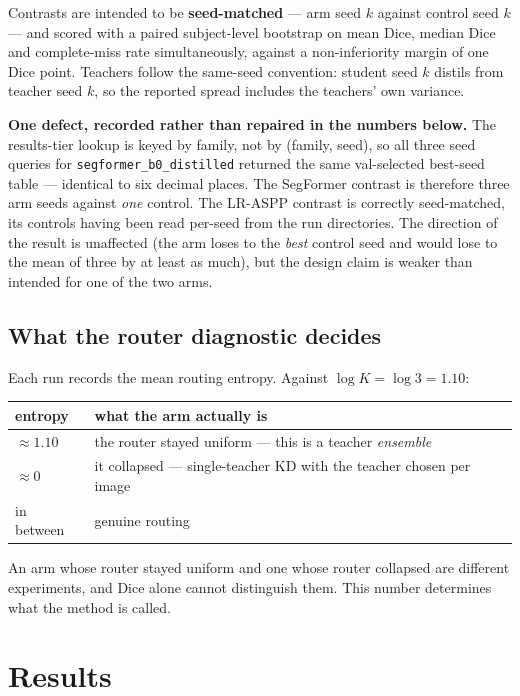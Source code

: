 \documentclass[11pt,a4paper]{article}
\begin{document}
Contrasts are intended to be \textbf{seed-matched} --- arm seed $k$ against
control seed $k$ --- and scored with a paired subject-level bootstrap on mean
Dice, median Dice and complete-miss rate simultaneously, against a
non-inferiority margin of one Dice point. Teachers follow the same-seed
convention: student seed $k$ distils from teacher seed $k$, so the reported
spread includes the teachers' own variance.

\textbf{One defect, recorded rather than repaired in the numbers below.} The
results-tier lookup is keyed by family, not by (family, seed), so all three seed
queries for \texttt{segformer\_b0\_distilled} returned the same val-selected
best-seed table --- identical to six decimal places. The SegFormer contrast is
therefore three arm seeds against \emph{one} control. The LR-ASPP contrast is
correctly seed-matched, its controls having been read per-seed from the run
directories. The direction of the result is unaffected (the arm loses to the
\emph{best} control seed and would lose to the mean of three by at least as
much), but the design claim is weaker than intended for one of the two arms.

\subsection{What the router diagnostic decides}

Each run records the mean routing entropy. Against $\log K = \log 3 = 1.10$:

\begin{center}
\small
\begin{tabular}{ll}
\toprule
entropy & what the arm actually is \\
\midrule
$\approx 1.10$ & the router stayed uniform --- this is a teacher \emph{ensemble} \\
$\approx 0$    & it collapsed --- single-teacher KD with the teacher chosen per image \\
in between     & genuine routing \\
\bottomrule
\end{tabular}
\end{center}

An arm whose router stayed uniform and one whose router collapsed are different
experiments, and Dice alone cannot distinguish them. This number determines what
the method is called.

\section{Results}
\label{sec:results}
\end{document}
